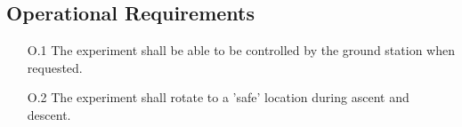 \subsection{Operational Requirements}

\begin{enumerate}
    \item[O.1] The experiment shall be able to be controlled by the ground station when requested.
    \item[O.2] The experiment shall rotate to a 'safe' location during ascent and descent.
\end{enumerate}